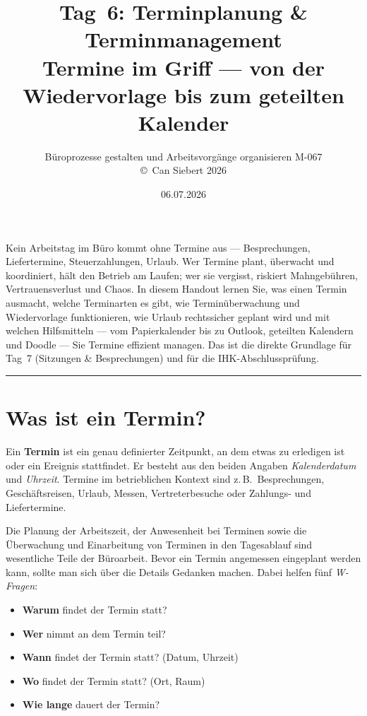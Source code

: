 \documentclass[11pt, a4paper]{article}
\title{\vspace*{-1.5cm}\Huge\bfseries\color{bfwPrimaryDark}Tag~6: Terminplanung \& Terminmanagement\\[0.4em]
  \large\color{bfwInkSoft}\textnormal{Termine im Griff --- von der Wiedervorlage bis zum geteilten Kalender}}
\author{\textsf{Büroprozesse gestalten und Arbeitsvorgänge organisieren \textperiodcentered{} M-067}\\
\textsf{\small\copyright\ Can Siebert\,\textperiodcentered\,2026}}
\date{06.07.2026}
\begin{document}
\maketitle
\thispagestyle{empty}

\vspace{1em}
\begin{merksatz}[title={\bfseries Worum geht es heute?}]
Kein Arbeitstag im Büro kommt ohne Termine aus --- Besprechungen, Liefertermine,
Steuerzahlungen, Urlaub. Wer Termine plant, überwacht und koordiniert, hält den Betrieb
am Laufen; wer sie vergisst, riskiert Mahngebühren, Vertrauensverlust und Chaos. In
diesem Handout lernen Sie, was einen Termin ausmacht, welche Terminarten es gibt, wie
Terminüberwachung und Wiedervorlage funktionieren, wie Urlaub rechtssicher geplant wird
und mit welchen Hilfsmitteln --- vom Papierkalender bis zu Outlook, geteilten Kalendern
und Doodle --- Sie Termine effizient managen. Das ist die direkte Grundlage für Tag~7
(Sitzungen \& Besprechungen) und für die IHK-Abschlussprüfung.
\end{merksatz}

\tableofcontents
\vspace{1em}
\hrule
\vspace{1em}

\section{Was ist ein Termin?}

Ein \textbf{Termin} ist ein genau definierter Zeitpunkt, an dem etwas zu erledigen ist
oder ein Ereignis stattfindet. Er besteht aus den beiden Angaben \emph{Kalenderdatum}
und \emph{Uhrzeit}. Termine im betrieblichen Kontext sind z.\,B.\ Besprechungen,
Geschäftsreisen, Urlaub, Messen, Vertreterbesuche oder Zahlungs- und Liefertermine.

Die Planung der Arbeitszeit, der Anwesenheit bei Terminen sowie die Überwachung und
Einarbeitung von Terminen in den Tagesablauf sind wesentliche Teile der Büroarbeit.
Bevor ein Termin angemessen eingeplant werden kann, sollte man sich über die Details
Gedanken machen. Dabei helfen fünf \emph{W-Fragen}:

\begin{itemize}
  \item \textbf{Warum} findet der Termin statt?
  \item \textbf{Wer} nimmt an dem Termin teil?
  \item \textbf{Wann} findet der Termin statt? (Datum, Uhrzeit)
  \item \textbf{Wo} findet der Termin statt? (Ort, Raum)
  \item \textbf{Wie lange} dauert der Termin?
\end{itemize}
\end{document}

